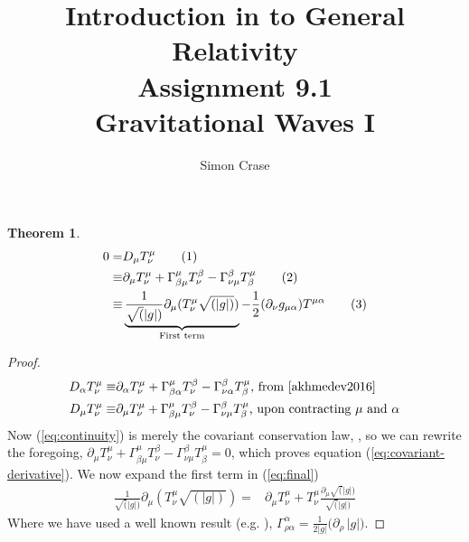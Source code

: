 \documentclass[]{article}
\title{Introduction in to General Relativity\\Assignment 9.1\\Gravitational Waves I}
\author{Simon Crase}
\newtheorem{theorem}{Theorem}
\newcommand\numberthis{\addtocounter{equation}{1}\tag{\theequation}}
\begin{document}
\maketitle


\begin{theorem}
	\begin{align*}
	0 =& D_{\mu} T^{\mu}_{\nu} \numberthis\label{eq:continuity} \\
	\equiv & \partial_{\mu} T^{\mu}_{\nu} + \Gamma^{\mu}_{\beta\mu}T^{\beta}_{\nu}-\Gamma^{\beta}_{\nu\mu}T^{\mu}_{\beta} \numberthis\label{eq:covariant-derivative}\\
	\equiv& \underbrace{\frac{1}{\sqrt(|g|)}\partial_{\mu}(T^{\mu}_{\nu}\sqrt{(|g|)})}_\text{First term} - \frac{1}{2}(\partial_{\nu}g_{\mu\alpha})T^{\mu\alpha} \numberthis\label{eq:final}
	\end{align*}
\end{theorem}

\begin{proof}
	\begin{align*}
	D_{\alpha} T^{\mu}_{\nu} 
	\equiv & \partial_{\alpha} T^{\mu}_{\nu} + \Gamma^{\mu}_{\beta\alpha}T^{\beta}_{\nu}-\Gamma^{\beta}_{\nu\alpha}T^{\mu}_{\beta} \text{, from \cite[(34)]{akhmedev2016}}\\
	D_{\mu} T^{\mu}_{\nu}
	\equiv & \partial_{\mu} T^{\mu}_{\nu} + \Gamma^{\mu}_{\beta\mu}T^{\beta}_{\nu}-\Gamma^{\beta}_{\nu\mu}T^{\mu}_{\beta}\text{, upon contracting $\mu$ and $\alpha$}
	\end{align*}
	Now (\ref{eq:continuity}) is merely the covariant conservation law, \cite[(80)]{akhmedev2016}, so we can rewrite the foregoing,
	$\partial_{\mu} T^{\mu}_{\nu} + \Gamma^{\mu}_{\beta\mu}T^{\beta}_{\nu}-\Gamma^{\beta}_{\nu\mu}T^{\mu}_{\beta}=0$, which proves equation (\ref{eq:covariant-derivative}).
	We now expand the first term in (\ref{eq:final})
	\begin{align*}
		\frac{1}{\sqrt(|g|)}\partial_{\mu}(T^{\mu}_{\nu}\sqrt{(|g|)}) =&\partial_{\mu}T^{\mu}_{\nu} + T^{\mu}_{\nu}\frac{\partial_{\mu}\sqrt(|g|)}{\sqrt(|g|)}
	\end{align*}
		Where we have used a well known result (e.g. \cite[equation (3.11)]{abs1965}), $\Gamma^{\alpha}_{\rho\alpha}=\frac{1}{2|g|}\big(\partial_\rho \, |g|\big)$.
\end{proof}
\end{document}
